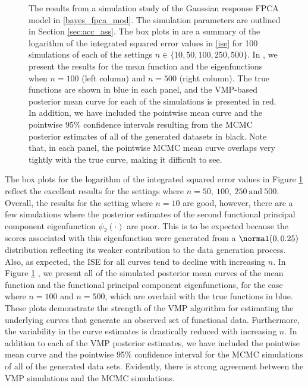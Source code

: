 \documentclass[ba]{imsart}
\numberwithin{equation}{section}
\theoremstyle{plain}
\begin{document}
\begin{figure}
\caption{
	The results from a simulation study of the Gaussian response FPCA model in \eqref{bayes_fpca_mod}. The
	simulation parameters are outlined in Section \ref{sec:acc_ass}.
	The box plots in  are a summary of the logarithm of the
	integrated squared error values in \eqref{ise}
	for 100 simulations of each of the settings $n \in \{ 10, 50, 100, 250, 500 \}$.
	In , we present the results for the mean function and the eigenfunctions when
	$n = 100$ (left column) and $n = 500$ (right column). The true functions are shown in blue in each panel,
	and the VMP-based posterior mean curve for each of the simulations is presented in red. In addition, we have
	included the pointwise mean curve and the pointwise 95\% confidence intervals resulting from the MCMC
	posterior estimates of all of the generated datasets in black. Note that, in each panel,
	the pointwise MCMC mean curve overlaps very tightly with the true curve,
	making it difficult to see.
}
\label{fig:gauss_resp_sim_st}
\end{figure}

The box plots for the logarithm of the integrated squared error values
in Figure \ref{fig:gauss_resp_sim_st}  reflect the excellent results for the
settings where $n = 50, \ 100, \ 250 \ \text{and} \ 500$.
Overall, the results for the setting where $n = 10$ are good, however,
there are a few simulations where the posterior estimates of the second functional principal component
eigenfunction $\psi_2 (\cdot)$ are poor. This is to be expected because the scores
associated with this eigenfunction were generated from a $\normal (0, 0.25)$ distribution reflecting its weaker
contribution to the data generation process. Also, as expected, the ISE for all curves tend to decline with
increasing $n$. In Figure \ref{fig:gauss_resp_sim_st} , we present all of the simulated
posterior mean curves of
the mean function and the functional principal component eigenfunctions, for the case where $n = 100$
and $n = 500$, which are
overlaid with the true functions in blue. These plots demonstrate the strength of the VMP algorithm for estimating
the underlying curves that generate an observed set of functional data. Furthermore, the variability in the curve
estimates is drastically reduced with increasing $n$. In addition to each of the VMP posterior
estimates, we have included the pointwise mean curve and the pointwise 95\% confidence interval for the MCMC
simulations of all of the generated data sets. Evidently, there is strong agreement between the VMP simulations
and the MCMC simulations.
\end{document}
